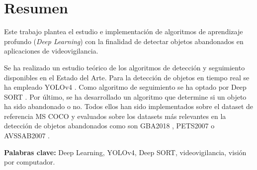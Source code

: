 
\chapter*{Resumen}
\label{cha:resumen}


Este trabajo plantea el estudio e implementación de algoritmos de aprendizaje profundo (\textit{Deep Learning}) con la finalidad de detectar objetos abandonados en aplicaciones de videovigilancia.

Se ha realizado un estudio teórico de los algoritmos de detección y seguimiento disponibles en el Estado del Arte. Para la detección de objetos en tiempo real se ha empleado YOLOv4 \cite{bochkovskiy2020yolov4}. Como algoritmo de seguimiento se ha optado por Deep SORT \cite{Wojke2017simple}. Por último, se ha desarrollado un algoritmo que determine si un objeto ha sido abandonado o no. Todos ellos han sido implementados sobre el dataset de referencia MS COCO \cite{lin2015microsoft} y evaluados sobre los datasets más relevantes en la detección de objetos abandonados como son GBA2018 \cite{gba-dataset}, PETS2007 \cite{pets2007-dataset} o AVSSAB2007 \cite{AVSSAB2007-dataset}.

\textbf{Palabras clave:} Deep Learning, YOLOv4, Deep SORT, videovigilancia, visión por computador.